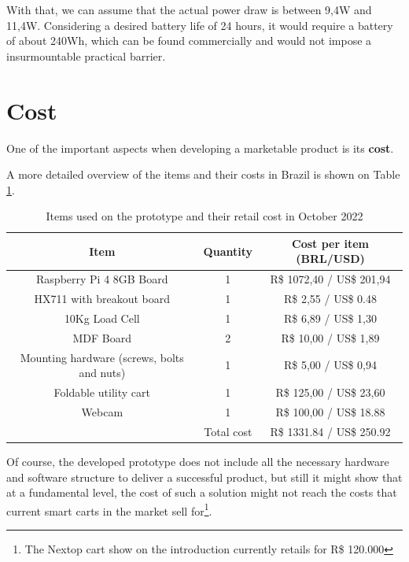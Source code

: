 \documentclass[openright]{normas-utf-tex} %
\begin{document}
With that, we can assume that the actual power draw is between 9,4W and 11,4W.
Considering a desired  battery life of 24 hours, it would require a battery of
about 240Wh, which can be found commercially and would not impose a
insurmountable practical barrier.

\section{Cost}

One of the important aspects when developing a marketable product is its \textbf{cost}.

A more detailed overview of the items and their costs in Brazil is shown on Table \ref{tbl:cost}.

\begin{table}[H]
	\centering
	\label{tab:correlacao}
	\begin{tabular}{c c c}
		\hline 
        Item & Quantity & Cost per item (BRL/USD) \\
		\hline
        Raspberry Pi 4 8GB Board &  1 & R\$ 1072,40 / US\$ 201,94 \\
        HX711 with breakout board &  1  & R\$ 2,55 / US\$ 0.48 \\
        10Kg Load Cell & 1 & R\$ 6,89 / US\$ 1,30 \\
        MDF Board &  2  & R\$ 10,00 / US\$ 1,89 \\
        Mounting hardware (screws, bolts and nuts) &  1  & R\$ 5,00 / US\$ 0,94 \\
        Foldable utility cart &  1  & R\$ 125,00 / US\$ 23,60 \\
        Webcam &  1  & R\$ 100,00 / US\$ 18.88 \\
		\hline 
        & Total cost & R\$ 1331.84 / US\$ 250.92 \\
        \hline
	\end{tabular}
    \caption[Items used on the prototype and their approximate retail cost in Brazil as of October 2022]{Items used on the prototype and their retail cost in October 2022}
    \label{tbl:cost}
\end{table}

Of course, the developed prototype does not include all the necessary hardware
and software structure to deliver a successful product, but still it might show that at a
fundamental level, the cost of such a solution might not reach the costs that
current smart carts in the market sell for\footnote{The Nextop cart show on the
introduction currently retails for R\$ 120.000}.
\end{document}
